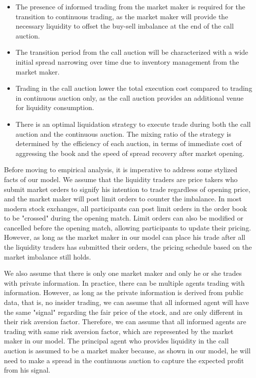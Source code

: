 \begin{itemize}
  \item The presence of informed trading from the market maker is required for the transition to continuous trading, as the market maker will provide the necessary liquidity to offset the buy-sell imbalance at the end of the call auction.
  \item The transition period from the call auction will be characterized with a wide initial spread narrowing over time due to inventory management from the market maker.
  \item Trading in the call auction lower the total execution cost compared to trading in continuous auction only, as the call auction provides an additional venue for liquidity consumption.
  \item There is an optimal liquidation strategy to execute trade during both the call auction and the continuous auction. The mixing ratio of the strategy is determined by the efficiency of each auction, in terms of immediate cost of aggressing the book and the speed of spread recovery after market opening.
\end{itemize}

Before moving to empirical analysis, it is imperative to address some stylized facts of our model. We assume that the liquidity traders are price takers who submit market orders to signify his intention to trade regardless of opening price, and the market maker will post limit orders to counter the imbalance. In most modern stock exchanges, all participants can post limit orders in the order book to be "crossed" during the opening match. Limit orders can also be modified or cancelled before the opening match, allowing participants to update their pricing. However, as long as the market maker in our model can place his trade after all the liquidity traders has submitted their orders, the pricing schedule based on the market imbalance still holds.

We also assume that there is only one market maker and only he or she trades with private information. In practice, there can be multiple agents trading with information. However, as long as the private information is derived from public data, that is, no insider trading, we can assume that all informed agent will have the same "signal" regarding the fair price of the stock, and are only different in their risk aversion factor. Therefore, we can assume that all informed agents are trading with same risk aversion factor, which are represented by the market maker in our model. The principal agent who provides liquidity in the call auction is assumed to be a market maker because, as shown in our model, he will need to make a spread in the continuous auction to capture the expected profit from his signal.

